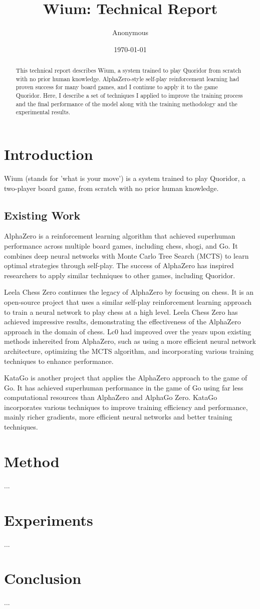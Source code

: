 \documentclass[a4paper]{article}
\title{\titlefont Wium: Technical Report}
\author{Anonymous}
\date{\today}
\begin{document}
\maketitle
\begin{abstract}
This technical report describes Wium, a system trained to play Quoridor from scratch with no prior human knowledge. AlphaZero-style self-play reinforcement learning had proven success for many board games, and I continue to apply it to the game Quoridor. Here, I describe a set of techniques I applied to improve the training process and the final performance of the model along with the training methodology and the experimental results.
\end{abstract}

\newpage
\tableofcontents
\newpage

\section{Introduction}
Wium (stands for 'what is your move') is a system trained to play Quoridor, a two-player board game, from scratch with no prior human knowledge.

\subsection{Existing Work}
AlphaZero \cite{silver2017mastering} is a reinforcement learning algorithm that achieved superhuman performance across multiple board games, including chess, shogi, and Go. It combines deep neural networks with Monte Carlo Tree Search (MCTS) to learn optimal strategies through self-play. The success of AlphaZero has inspired researchers to apply similar techniques to other games, including Quoridor.

Leela Chess Zero \cite{leela} continues the legacy of AlphaZero by focusing on chess. It is an open-source project that uses a similar self-play reinforcement learning approach to train a neural network to play chess at a high level. Leela Chess Zero has achieved impressive results, demonstrating the effectiveness of the AlphaZero approach in the domain of chess. Lc0 had improved over the years upon existing methods inhereited from AlphaZero, such as using a more efficient neural network architecture, optimizing the MCTS algorithm, and incorporating various training techniques to enhance performance.

KataGo \cite{kata} is another project that applies the AlphaZero approach to the game of Go. It has achieved superhuman performance in the game of Go using far less computational resources than AlphaZero and AlphaGo Zero. KataGo incorporates various techniques to improve training efficiency and performance, mainly richer gradients, more efficient neural networks and better training techniques.
\section{Method}
...

\section{Experiments}
...

\section{Conclusion}
...

% 
% 
\end{document}
